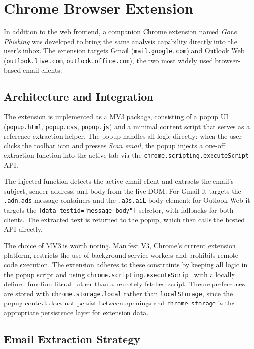 \section{Chrome Browser Extension}

In addition to the web frontend, a companion Chrome extension named \textit{Gone Phishing} was developed to bring the same analysis capability directly into the user's inbox. The extension targets Gmail (\texttt{mail.google.com}) and Outlook Web (\texttt{outlook.live.com}, \texttt{outlook.office.com}), the two most widely used browser-based email clients.

\subsection{Architecture and Integration}

The extension is implemented as a \ac{MV3} package, consisting of a popup UI (\texttt{popup.html}, \texttt{popup.css}, \texttt{popup.js}) and a minimal content script that serves as a reference extraction helper. The popup handles all logic directly: when the user clicks the toolbar icon and presses \textit{Scan email}, the popup injects a one-off extraction function into the active tab via the \texttt{chrome.scripting.executeScript} \ac{API}.

The injected function detects the active email client and extracts the email's subject, sender address, and body from the live DOM. For Gmail it targets the \texttt{.adn.ads} message containers and the \texttt{.a3s.aiL} body element; for Outlook Web it targets the \texttt{[data-testid="message-body"]} selector, with fallbacks for both clients. The extracted text is returned to the popup, which then calls the hosted \ac{API} directly.

The choice of \ac{MV3} is worth noting. Manifest V3, Chrome's current extension platform, restricts the use of background service workers and prohibits remote code execution. The extension adheres to these constraints by keeping all logic in the popup script and using \texttt{chrome.scripting.executeScript} with a locally defined function literal rather than a remotely fetched script. Theme preferences are stored with \texttt{chrome.storage.local} rather than \texttt{localStorage}, since the popup context does not persist between openings and \texttt{chrome.storage} is the appropriate persistence layer for extension data.

\subsection{Email Extraction Strategy}

